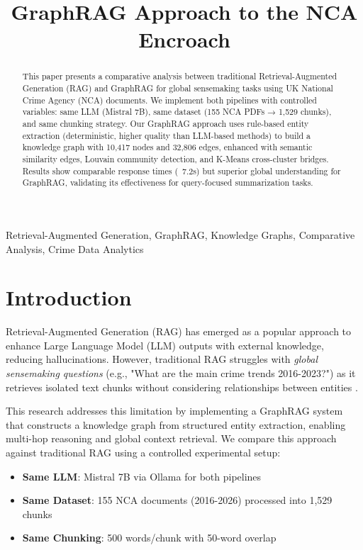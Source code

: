 \documentclass[conference]{IEEEtran}
\begin{document}
\title{GraphRAG Approach to the NCA Encroach}

\author{
}

\maketitle

\begin{abstract}
This paper presents a comparative analysis between traditional Retrieval-Augmented Generation (RAG) and GraphRAG for global sensemaking tasks using UK National Crime Agency (NCA) documents. We implement both pipelines with controlled variables: same LLM (Mistral 7B), same dataset (155 NCA PDFs → 1,529 chunks), and same chunking strategy. Our GraphRAG approach uses rule-based entity extraction (deterministic, higher quality than LLM-based methods) to build a knowledge graph with 10,417 nodes and 32,806 edges, enhanced with semantic similarity edges, Louvain community detection, and K-Means cross-cluster bridges. Results show comparable response times (~7.2s) but superior global understanding for GraphRAG, validating its effectiveness for query-focused summarization tasks.
\end{abstract}

\begin{IEEEkeywords}
Retrieval-Augmented Generation, GraphRAG, Knowledge Graphs, Comparative Analysis, Crime Data Analytics
\end{IEEEkeywords}

\section{Introduction}
Retrieval-Augmented Generation (RAG) has emerged as a popular approach to enhance Large Language Model (LLM) outputs with external knowledge, reducing hallucinations. However, traditional RAG struggles with \textit{global sensemaking questions} (e.g., "What are the main crime trends 2016-2023?") as it retrieves isolated text chunks without considering relationships between entities \cite{edge2024graphrag}.

This research addresses this limitation by implementing a GraphRAG system that constructs a knowledge graph from structured entity extraction, enabling multi-hop reasoning and global context retrieval. We compare this approach against traditional RAG using a controlled experimental setup:
\begin{itemize}
\item \textbf{Same LLM}: Mistral 7B via Ollama for both pipelines
\item \textbf{Same Dataset}: 155 NCA documents (2016-2026) processed into 1,529 chunks
\item \textbf{Same Chunking}: 500 words/chunk with 50-word overlap
\end{itemize}
\end{document}
